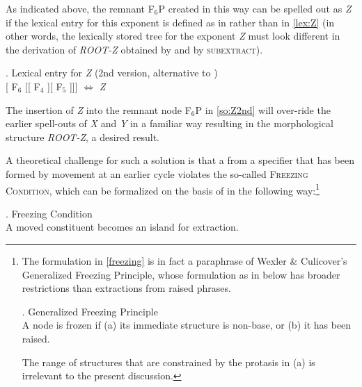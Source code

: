 \noindent As indicated above, the remnant F$_{6}$P created in this way can be spelled out as \textit{Z} if the lexical entry for this exponent is defined as in \Next rather than in \ref{lex:Z} (in other words, the lexically stored tree for the exponent \textit{Z} must look different in the derivation of \textit{ROOT-Z} obtained by  and by \textsc{subextract}). 

\ex.\label{lex:Z2nd} Lexical entry for \textit{Z} (2nd version, alternative to )\\[1ex]
[ F$_{6}$ [[ F$_{4}$ ][ F$_{5}$ ]]] $\Leftrightarrow$ \textit{Z}

The insertion of \textit{Z} into the remnant node F$_{6}$P in \ref{so:Z2nd} will over-ride the earlier spell-outs of \textit{X} and \textit{Y} in a familiar way resulting in the morphological structure \textit{ROOT-Z}, a desired result.\largerpage
\par
A theoretical challenge for such a solution is that a  from a specifier that has been formed by movement at an earlier cycle violates the so-called \textsc{Freezing Condition},   which can be formalized on the basis of \cite{Wexler-Culicover1980} in the following way:\footnote{The formulation in \ref{freezing} is in fact a paraphrase of Wexler \& Culicover's \citeyearpar[542]{Wexler-Culicover1980} Generalized Freezing Principle, whose formulation as in \Next  below has broader restrictions than extractions from raised phrases.    

\noindent\parbox{\linguexfootnotewidth}{\ex. Generalized Freezing Principle\\[0.5ex] 
A node is frozen if (a) its immediate structure is non-base, or (b) it has been raised.

}

\noindent The range of structures that are constrained by the protasis in (a) is irrelevant to the present discussion.}%

\ex.\label{freezing} Freezing Condition\\[0.5ex]
A moved constituent becomes an island for extraction. 

